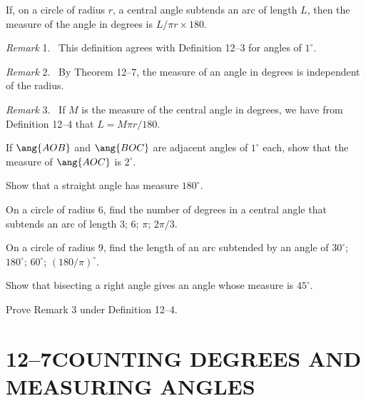 \documentclass[11pt]{book}
\theoremstyle{bkplain}
\theoremstyle{XIplainnote}
\theoremstyle{bkplain}
\newenvironment{XIIremarkn}[1]{\par\medskip\noindent\emph{Remark} #1.\ }%
  {\par\medskip}
\theoremstyle{bkplain}
\begin{document}
\begin{definition}
If, on a circle of radius $r$, a central angle subtends an arc of length $L$,
then the measure of the angle in degrees is $L/\pi r \times 180$.
\end{definition}

\begin{XIIremarkn}{1}
This definition agrees with Definition 12--3 for angles of $1^\circ$.
\end{XIIremarkn}

\begin{XIIremarkn}{2}
By Theorem 12--7, the measure of an angle in degrees is independent of the
radius.
\end{XIIremarkn}

\begin{XIIremarkn}{3}
If $M$ is the measure of the central angle in degrees, we have from
Definition 12--4 that $L = M\pi r/180$.
\end{XIIremarkn}

\begin{exercisecols}
\begin{exlist}
\item If $\ang{AOB}$ and $\ang{BOC}$ are adjacent angles of $1^\circ$ each, show
      that the measure of $\ang{AOC}$ is $2^\circ$.
\item Show that a straight angle has measure $180^\circ$.
\item On a circle of radius 6, find the number of degrees in a central angle
      that subtends an arc of length 3; 6; $\pi$; $2\pi/3$.
\item On a circle of radius 9, find the length of an arc subtended by an angle
      of $30^\circ$; $180^\circ$; $60^\circ$; $(180/\pi)^\circ$.
\item Show that bisecting a right angle gives an angle whose measure is
      $45^\circ$.
\item Prove Remark 3 under Definition 12--4.
\end{exlist}
\end{exercisecols}

\section*{12--7\quad COUNTING DEGREES AND\\MEASURING ANGLES}
\end{document}
